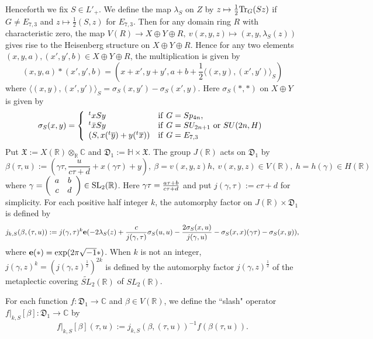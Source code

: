\documentclass[11pt]{amsart}
\numberwithin{equation}{section}
\theoremstyle{definition}
\begin{document}
Henceforth we fix $S\in L'_+$. We define the map $\lambda_S$ on $Z$ by $z\mapsto \frac{1}{2}{{\rm Tr}}_G(Sz)$ if $G\not=E_{7,3} $ and
$z\mapsto \frac{1}{2}(S,z)$ for $E_{7,3}$.
Then for any domain ring $R$ with characteristic zero, the map $V(R){\longrightarrow} X\oplus Y\oplus R,\ v(x,y,z)\mapsto (x,y,\lambda_S(z))$
gives rise to the Heisenberg structure on $X\oplus Y\oplus R$. Hence
for any two elements $(x,y,a),(x',y',b)\in X\oplus Y\oplus R$, the multiplication is given by
$$(x,y,a)\ast(x',y',b)=(x+x',y+y',a+b+\frac{1}{2}\langle (x,y),(x',y') \rangle_S)$$
where $\langle (x,y),(x',y') \rangle_S=\sigma_S(x,y')-\sigma_S(x',y)$.
Here $\sigma_S(\ast,\ast)$ on $X\oplus Y$ is given by
   $$\sigma_S(x,y)= \left\{
\begin{array}{ll}
{}^t xS y  & {\rm if}\ G=Sp_{4n},\\
{}^t {\bar x}S y  & {\rm if}\ G=SU_{2n+1}\ {\rm or}\ SU(2n,H) \\
 (S,x({}^t\overline{y})+y({}^t\overline{x})) & {\rm if}\ G=E_{7,3}
\end{array}\right.
$$
Put $\mathfrak{X}:=X({\mathbb{R}})\otimes_{\mathbb{R}}{\mathbb{C}}$ and ${\mathfrak{D}}_1:=\mathbb{H}\times \mathfrak{X}$.
The group $J({\mathbb{R}})$ acts on $\mathfrak{D}_1$ by
$$\beta(\tau,u):=\left(\gamma \tau,\frac{u}{c\tau+d}+x(\gamma \tau)+y \right),\
\beta=v(x,y,z)h,\ v(x,y,z)\in V({\mathbb{R}}),\ h=h(\gamma)\in H({\mathbb{R}})$$ where
$\gamma=\left(\begin{array}{cc}
a & b \\
c & d
\end{array}\right)\in {\rm SL}_2({\mathbb{R}})$.
Here $\gamma \tau={\displaystyle}\frac{a\tau+b}{c\tau+d}$ and put $j(\gamma,\tau):=c\tau+d$ for simplicity.
For each positive half integer $k$, the automorphy factor on $J({\mathbb{R}})\times \mathfrak{D}_1$ is defined by
$$j_{k,S}(\beta,(\tau,u)):=j(\gamma,\tau)^{k}
\bold{e}(-2\lambda_S(z)+\frac{c}{j(\gamma,\tau)}\sigma_S(u,u)-\frac{2\sigma_S(x,u)}{j(\gamma,u)}-
\sigma_S(x,x)(\gamma\tau)-\sigma_S(x,y)),
$$
where $\bold{e}(\ast)=\exp(2\pi\sqrt{-1}\ast)$.
When $k$ is not an integer, $j(\gamma,z)^k=(j(\gamma,z)^\frac{1}{2})^{2k}$ is defined by the automorphy factor
$j(\gamma,z)^\frac{1}{2}$ of the metaplectic covering $\widetilde{SL}_2({\mathbb{R}})$
of $SL_2({\mathbb{R}})$.

For each function $f:\mathfrak{D}_1{\longrightarrow} {\mathbb{C}}$ and $\beta\in V({\mathbb{R}})$,
we define the ``slash" operator $f|_{k,S}[\beta]:\mathfrak{D}_1{\longrightarrow} {\mathbb{C}}$ by
$$f|_{k,S}[\beta](\tau,u):=j_{k,S}(\beta,(\tau,u))^{-1}f(\beta(\tau,u)).
$$
\end{document}
